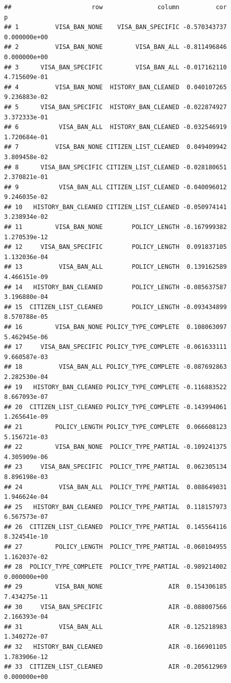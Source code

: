 \documentclass[]{article}
\begin{document}
\begin{verbatim}
##                      row               column          cor            p
## 1          VISA_BAN_NONE    VISA_BAN_SPECIFIC -0.570343737 0.000000e+00
## 2          VISA_BAN_NONE         VISA_BAN_ALL -0.811496846 0.000000e+00
## 3      VISA_BAN_SPECIFIC         VISA_BAN_ALL -0.017162110 4.715609e-01
## 4          VISA_BAN_NONE  HISTORY_BAN_CLEANED  0.040107265 9.236883e-02
## 5      VISA_BAN_SPECIFIC  HISTORY_BAN_CLEANED -0.022874927 3.372333e-01
## 6           VISA_BAN_ALL  HISTORY_BAN_CLEANED -0.032546919 1.720684e-01
## 7          VISA_BAN_NONE CITIZEN_LIST_CLEANED  0.049409942 3.809458e-02
## 8      VISA_BAN_SPECIFIC CITIZEN_LIST_CLEANED -0.028180651 2.370821e-01
## 9           VISA_BAN_ALL CITIZEN_LIST_CLEANED -0.040096012 9.246035e-02
## 10   HISTORY_BAN_CLEANED CITIZEN_LIST_CLEANED -0.050974141 3.238934e-02
## 11         VISA_BAN_NONE        POLICY_LENGTH -0.167999382 1.270539e-12
## 12     VISA_BAN_SPECIFIC        POLICY_LENGTH  0.091837105 1.132036e-04
## 13          VISA_BAN_ALL        POLICY_LENGTH  0.139162589 4.466151e-09
## 14   HISTORY_BAN_CLEANED        POLICY_LENGTH -0.085637587 3.196880e-04
## 15  CITIZEN_LIST_CLEANED        POLICY_LENGTH -0.093434899 8.570788e-05
## 16         VISA_BAN_NONE POLICY_TYPE_COMPLETE  0.108063097 5.462945e-06
## 17     VISA_BAN_SPECIFIC POLICY_TYPE_COMPLETE -0.061633111 9.660587e-03
## 18          VISA_BAN_ALL POLICY_TYPE_COMPLETE -0.087692863 2.282530e-04
## 19   HISTORY_BAN_CLEANED POLICY_TYPE_COMPLETE -0.116883522 8.667093e-07
## 20  CITIZEN_LIST_CLEANED POLICY_TYPE_COMPLETE -0.143994061 1.265641e-09
## 21         POLICY_LENGTH POLICY_TYPE_COMPLETE  0.066608123 5.156721e-03
## 22         VISA_BAN_NONE  POLICY_TYPE_PARTIAL -0.109241375 4.305909e-06
## 23     VISA_BAN_SPECIFIC  POLICY_TYPE_PARTIAL  0.062305134 8.896198e-03
## 24          VISA_BAN_ALL  POLICY_TYPE_PARTIAL  0.088649031 1.946624e-04
## 25   HISTORY_BAN_CLEANED  POLICY_TYPE_PARTIAL  0.118157973 6.567573e-07
## 26  CITIZEN_LIST_CLEANED  POLICY_TYPE_PARTIAL  0.145564116 8.324541e-10
## 27         POLICY_LENGTH  POLICY_TYPE_PARTIAL -0.060104955 1.162037e-02
## 28  POLICY_TYPE_COMPLETE  POLICY_TYPE_PARTIAL -0.989214002 0.000000e+00
## 29         VISA_BAN_NONE                  AIR  0.154306185 7.434275e-11
## 30     VISA_BAN_SPECIFIC                  AIR -0.088007566 2.166393e-04
## 31          VISA_BAN_ALL                  AIR -0.125218983 1.340272e-07
## 32   HISTORY_BAN_CLEANED                  AIR -0.166901105 1.783906e-12
## 33  CITIZEN_LIST_CLEANED                  AIR -0.205612969 0.000000e+00

\end{verbatim}
\end{document}
